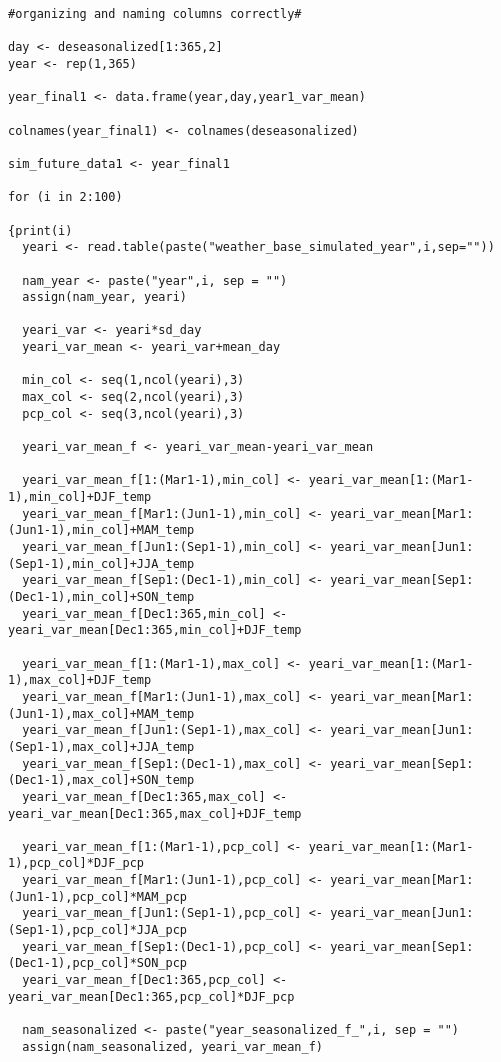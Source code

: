 \begin{lstlisting}
#organizing and naming columns correctly#

day <- deseasonalized[1:365,2]
year <- rep(1,365)

year_final1 <- data.frame(year,day,year1_var_mean)

colnames(year_final1) <- colnames(deseasonalized)

sim_future_data1 <- year_final1

for (i in 2:100)

{print(i)
  yeari <- read.table(paste("weather_base_simulated_year",i,sep=""))

  nam_year <- paste("year",i, sep = "")
  assign(nam_year, yeari)
  
  yeari_var <- yeari*sd_day
  yeari_var_mean <- yeari_var+mean_day
  
  min_col <- seq(1,ncol(yeari),3)
  max_col <- seq(2,ncol(yeari),3)
  pcp_col <- seq(3,ncol(yeari),3)
  
  yeari_var_mean_f <- yeari_var_mean-yeari_var_mean
  
  yeari_var_mean_f[1:(Mar1-1),min_col] <- yeari_var_mean[1:(Mar1-1),min_col]+DJF_temp
  yeari_var_mean_f[Mar1:(Jun1-1),min_col] <- yeari_var_mean[Mar1:(Jun1-1),min_col]+MAM_temp
  yeari_var_mean_f[Jun1:(Sep1-1),min_col] <- yeari_var_mean[Jun1:(Sep1-1),min_col]+JJA_temp
  yeari_var_mean_f[Sep1:(Dec1-1),min_col] <- yeari_var_mean[Sep1:(Dec1-1),min_col]+SON_temp
  yeari_var_mean_f[Dec1:365,min_col] <- yeari_var_mean[Dec1:365,min_col]+DJF_temp
  
  yeari_var_mean_f[1:(Mar1-1),max_col] <- yeari_var_mean[1:(Mar1-1),max_col]+DJF_temp
  yeari_var_mean_f[Mar1:(Jun1-1),max_col] <- yeari_var_mean[Mar1:(Jun1-1),max_col]+MAM_temp
  yeari_var_mean_f[Jun1:(Sep1-1),max_col] <- yeari_var_mean[Jun1:(Sep1-1),max_col]+JJA_temp
  yeari_var_mean_f[Sep1:(Dec1-1),max_col] <- yeari_var_mean[Sep1:(Dec1-1),max_col]+SON_temp
  yeari_var_mean_f[Dec1:365,max_col] <- yeari_var_mean[Dec1:365,max_col]+DJF_temp
  
  yeari_var_mean_f[1:(Mar1-1),pcp_col] <- yeari_var_mean[1:(Mar1-1),pcp_col]*DJF_pcp
  yeari_var_mean_f[Mar1:(Jun1-1),pcp_col] <- yeari_var_mean[Mar1:(Jun1-1),pcp_col]*MAM_pcp
  yeari_var_mean_f[Jun1:(Sep1-1),pcp_col] <- yeari_var_mean[Jun1:(Sep1-1),pcp_col]*JJA_pcp
  yeari_var_mean_f[Sep1:(Dec1-1),pcp_col] <- yeari_var_mean[Sep1:(Dec1-1),pcp_col]*SON_pcp
  yeari_var_mean_f[Dec1:365,pcp_col] <- yeari_var_mean[Dec1:365,pcp_col]*DJF_pcp

  nam_seasonalized <- paste("year_seasonalized_f_",i, sep = "")
  assign(nam_seasonalized, yeari_var_mean_f)


\end{lstlisting}
